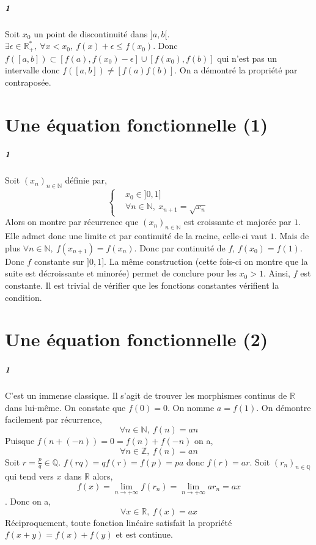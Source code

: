 \documentclass[10pt,a4paper]{article}
\begin{document}
\subparagraph{1}Soit $x_0$ un point de discontinuité dans $]a,b[$. $\exists \epsilon \in \mathbb{R}_+^*, \ \forall x<x_0, \ f(x) + \epsilon \le f(x_0)$. Donc $f([a,b]) \subset [f(a), f(x_0)-\epsilon] \cup [f(x_0), f(b)]$ qui n'est pas un intervalle donc $f([a,b]) \neq [f(a) f(b)]$. On a démontré la propriété par contraposée.

\section{Une équation fonctionnelle (1)}

\subparagraph{1}Soit $(x_n)_{n \in \mathbb{N}}$ définie par,
\begin{equation}
\left\lbrace
\begin{aligned}
&x_0 \in ]0,1] \\
&\forall n \in \mathbb{N}, \ x_{n+1} = \sqrt{x_n}
\end{aligned}
\right.
\end{equation}
Alors on montre par récurrence que $(x_n)_{n \in \mathbb{N}}$ est croissante et majorée par $1$. Elle admet donc une limite et par continuité de la racine, celle-ci vaut $1$. Mais de plus $\forall n \in \mathbb{N}, \ f(x_{n+1}) = f(x_n)$. Donc par continuité de $f$, $f(x_0) = f(1)$. Donc $f$ constante sur $]0,1]$. La même construction (cette fois-ci on montre que la suite est décroissante et minorée) permet de conclure pour les $x_0>1$. Ainsi, $f$ est constante. Il est trivial de vérifier que les fonctions constantes vérifient la condition.

\section{Une équation fonctionnelle (2)}

\subparagraph{1}C'est un immense classique. Il s'agit de trouver les morphismes continus de $\mathbb{R}$ dans lui-même. On constate que $f(0) = 0$. On nomme $a=f(1)$. On démontre facilement par récurrence,
\begin{equation}
\forall n \in \mathbb{N}, \ f(n) = an
\end{equation}
Puisque $f(n+(-n)) = 0 = f(n) + f(-n)$ on a,
\begin{equation}
\forall n \in \mathbb{Z}, \ f(n) = an
\end{equation}
Soit $r = \frac{p}{q} \in \mathbb{Q}$. $f(rq) = qf(r) = f(p) = pa$ donc $f(r) = ar$. Soit $(r_n)_{n \in \mathbb{Q}}$ qui tend vers $x$ dans $\mathbb{R}$ alors,
\begin{equation}
f(x) = \underset{n \rightarrow +\infty}{\lim} f(r_n) = \underset{n \rightarrow +\infty}{\lim} ar_n = ax
\end{equation}. Donc on a,
\begin{equation}
\forall x \in \mathbb{R}, \ f(x) = ax
\end{equation}
Réciproquement, toute fonction linéaire satisfait la propriété $f(x+y) = f(x) +f(y)$ et est continue.
\end{document}
